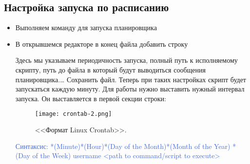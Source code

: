 \subsection{Настройка запуска по расписанию}

\begin{itemize}
	\item  Выполняем команду для запуска планировщика
	
%		
	
	\item В открывшемся редакторе в конец файла добавить строку
	

		
%		

	Здесь мы указываем периодичность запуска, полный путь к исполняемому скрипту, путь до файла в который будут выводиться сообщения планировщика.\ldots{}
	Сохранить файл. Теперь при таких настройках скрипт будет запускаться каждую минуту. Для работы нужно выставить нужный интервал запуска.	Он выставляется в первой секции строки:
	
	\begin{figure}[H]
		\texttt{[image: crontab-2.png]}
		\caption{<<Формат Linux Crontab>>.}
		\label{ris:crontab-2.png}
	\end{figure}
	
	\textcolor{RoyalBlue}{Синтаксис:
	*(Minute)*(Hour)*(Day of the Month)*(Month of the Year) *(Day of the Week) username <path to command/script to execute>}


	
	\begin{tabular}{|l|l|}
		

\end{tabular}
\end{itemize}
